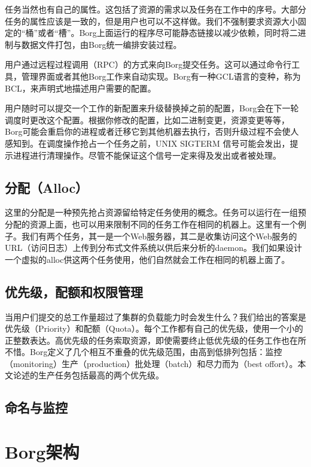 任务当然也有自己的属性。这包括了资源的需求以及任务在工作中的序号。大部分任务的属性应该是一致的，但是用户也可以不这样做。我们不强制要求资源大小固定的“桶”或者“槽”。Borg上面运行的程序尽可能静态链接以减少依赖，同时将二进制与数据文件打包，由Borg统一编排安装过程。

用户通过远程过程调用（RPC）的方式来向Borg提交任务。这可以通过命令行工具，管理界面或者其他Borg工作来自动实现。Borg有一种GCL语言的变种，称为BCL，来声明式地描述用户需要的配置。

用户随时可以提交一个工作的新配置来升级替换掉之前的配置，Borg会在下一轮调度时更改这个配置。根据你修改的配置，比如二进制变更，资源变更等等，Borg可能会重启你的进程或者迁移它到其他机器去执行，否则升级过程不会使人感知到。在调度操作抢占一个任务之前，UNIX SIGTERM 信号可能会发出，提示进程进行清理操作。尽管不能保证这个信号一定来得及发出或者被处理。

\subsection{分配（Alloc）}

这里的分配是一种预先抢占资源留给特定任务使用的概念。任务可以运行在一组预分配的资源上面，也可以用来限制不同的任务工作在相同的机器上。这里有一个例子。我们有两个任务，其一是一个Web服务器，其二是收集访问这个Web服务的URL（访问日志）上传到分布式文件系统以供后来分析的daemon。我们如果设计一个虚拟的alloc供这两个任务使用，他们自然就会工作在相同的机器上面了。

\subsection{优先级，配额和权限管理}

当用户们提交的总工作量超过了集群的负载能力时会发生什么？我们给出的答案是优先级（Priority）和配额（Quota）。每个工作都有自己的优先级，使用一个小的正整数表达。高优先级的任务索取资源，即使需要终止低优先级的任务工作也在所不惜。Borg定义了几个相互不重叠的优先级范围，由高到低排列包括：监控（monitoring）生产（production）批处理（batch）和尽力而为（best offort）。本文论述的生产任务包括最高的两个优先级。

\subsection{命名与监控}

\section{Borg架构}

